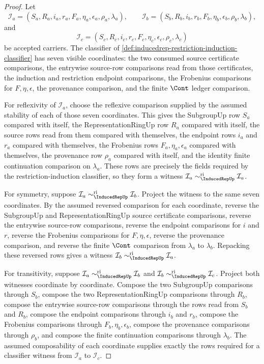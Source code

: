 \begin{proof}
Let
$$
\mathcal{I}_a=(S_a,R_a,i_a,r_a,F_a,\eta_a,\epsilon_a,\rho_a,\lambda_a),
\qquad
\mathcal{I}_b=(S_b,R_b,i_b,r_b,F_b,\eta_b,\epsilon_b,\rho_b,\lambda_b),
$$
and
$$
\mathcal{I}_c=(S_c,R_c,i_c,r_c,F_c,\eta_c,\epsilon_c,\rho_c,\lambda_c)
$$
be accepted carriers. The classifier of
\autoref{def:inducedrep-restriction-induction-classifier} has seven visible
coordinates: the two consumed source certificate comparisons, the entrywise
source-row comparisons read from those certificates, the induction and
restriction endpoint comparisons, the Frobenius comparisons for
$F,\eta,\epsilon$, the provenance comparison, and the finite $\Cont$ ledger
comparison.

For reflexivity of $\mathcal{I}_a$, choose the reflexive comparison supplied
by the assumed stability of each of those seven coordinates. This gives the
SubgroupUp row $S_a$ compared with itself, the RepresentationRingUp row $R_a$
compared with itself, the source rows read from them compared with themselves,
the endpoint rows $i_a$ and $r_a$ compared with themselves, the Frobenius rows
$F_a,\eta_a,\epsilon_a$ compared with themselves, the provenance row
$\rho_a$ compared with itself, and the identity finite continuation comparison
on $\lambda_a$. These rows are precisely the fields required by the
restriction-induction classifier, so they form a witness
$\mathcal{I}_a\sim_{\InducedRepUp}^{\mathrm{ri}}\mathcal{I}_a$.

For symmetry, suppose
$\mathcal{I}_a\sim_{\InducedRepUp}^{\mathrm{ri}}\mathcal{I}_b$. Project the
witness to the same seven coordinates. By the assumed reversed comparison for
each coordinate, reverse the SubgroupUp and RepresentationRingUp source
certificate comparisons, reverse the entrywise source-row comparisons, reverse
the endpoint comparisons for $i$ and $r$, reverse the Frobenius comparisons for
$F,\eta,\epsilon$, reverse the provenance comparison, and reverse the finite
$\Cont$ comparison from $\lambda_a$ to $\lambda_b$. Repacking these reversed
rows gives a witness
$\mathcal{I}_b\sim_{\InducedRepUp}^{\mathrm{ri}}\mathcal{I}_a$.

For transitivity, suppose
$\mathcal{I}_a\sim_{\InducedRepUp}^{\mathrm{ri}}\mathcal{I}_b$ and
$\mathcal{I}_b\sim_{\InducedRepUp}^{\mathrm{ri}}\mathcal{I}_c$. Project both
witnesses coordinate by coordinate. Compose the two SubgroupUp comparisons
through $S_b$, compose the two RepresentationRingUp comparisons through
$R_b$, compose the entrywise source-row comparisons through the rows read from
$S_b$ and $R_b$, compose the endpoint comparisons through $i_b$ and $r_b$,
compose the Frobenius comparisons through
$F_b,\eta_b,\epsilon_b$, compose the provenance comparisons through
$\rho_b$, and compose the finite continuation comparisons through
$\lambda_b$. The assumed composability of each coordinate supplies exactly the
rows required for a classifier witness from $\mathcal{I}_a$ to
$\mathcal{I}_c$.


\end{proof}
